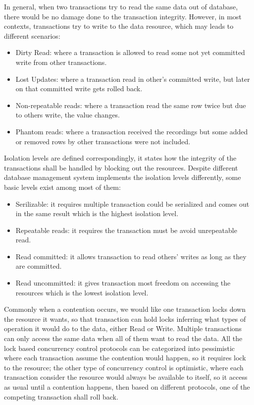 In general, when two transactions try to read the same data out of database, there would be no damage done to the transaction integrity\cite{gray1992transaction}. However, in most contexts, transactions try to write to the data resource, which may leads to different scenarios:
\begin{itemize}
\item Dirty Read: where a transaction is allowed to read some not yet committed write from other transactions.

\item Lost Updates: where a transaction read in other's committed write, but later on that committed write gets rolled back.

\item Non-repeatable reads: where a transaction read the same row twice but due to others write, the value changes.

\item Phantom reads: where a transaction received the recordings but some added or removed rows by other transactions were not included.
\end{itemize}


Isolation levels are defined correspondingly, it states how the integrity of the transactions shall be handled by blocking out the resources. Despite different database management system implements the isolation levels differently, some basic levels exist among most of them:
\begin{itemize}
	\item Serilizable: it requires multiple transaction could be serialized and comes out in the same result which is the highest isolation level.
	
	\item Repeatable reads: it requires the transaction must be avoid unrepeatable read.
	
	\item Read committed: it allows transaction to read others' writes as long as they are committed.
	
	\item Read uncommitted: it gives transaction most freedom on accessing the resources which is the lowest isolation level.
\end{itemize}


Commonly when a contention occurs, we would like one transaction locks down the resource it wants, so that transaction can hold locks inferring what types of operation it would do to the data, either Read or Write. Multiple transactions can only access the same data when all of them want to read the data. All the lock based concurrency control protocols can be categorized into pessimistic where each transaction assume the contention would happen, so it requires lock to the resource; the other type of concurrency control is optimistic, where each transaction consider the resource would always be available to itself, so it access as usual until a contention happens, then based on different protocols, one of the competing transaction shall roll back.
